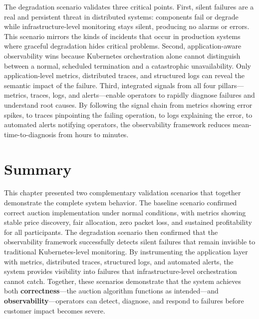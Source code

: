 The degradation scenario validates three critical points. First, silent failures are a real and persistent threat in distributed systems: components fail or degrade while infrastructure-level monitoring stays silent, producing no alarms or errors. This scenario mirrors the kinds of incidents that occur in production systems where graceful degradation hides critical problems. Second, application-aware observability wins because Kubernetes orchestration alone cannot distinguish between a normal, scheduled termination and a catastrophic unavailability. Only application-level metrics, distributed traces, and structured logs can reveal the semantic impact of the failure. Third, integrated signals from all four pillars—metrics, traces, logs, and alerts—enable operators to rapidly diagnose failures and understand root causes. By following the signal chain from metrics showing error spikes, to traces pinpointing the failing operation, to logs explaining the error, to automated alerts notifying operators, the observability framework reduces mean-time-to-diagnosis from hours to minutes.

\section{Summary}

This chapter presented two complementary validation scenarios that together demonstrate the complete system behavior. The baseline scenario confirmed correct auction implementation under normal conditions, with metrics showing stable price discovery, fair allocation, zero packet loss, and sustained profitability for all participants. The degradation scenario then confirmed that the observability framework successfully detects silent failures that remain invisible to traditional Kubernetes-level monitoring. By instrumenting the application layer with metrics, distributed traces, structured logs, and automated alerts, the system provides visibility into failures that infrastructure-level orchestration cannot catch. Together, these scenarios demonstrate that the system achieves both \textbf{correctness}—the auction algorithm functions as intended—and \textbf{observability}—operators can detect, diagnose, and respond to failures before customer impact becomes severe.